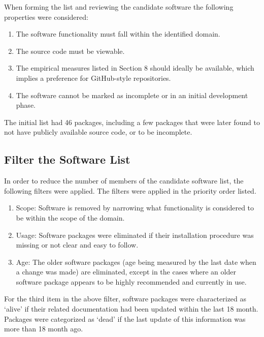 \documentclass[12pt, notitlepage]{article}
\begin{document}
When forming the list and reviewing the candidate software the following properties were considered:

\begin{enumerate}
	\item The software functionality must fall within the identified domain.
	\item The source code must be viewable.
	\item The empirical measures listed in Section 8 should ideally be available, which implies a preference for GitHub-style repositories.
	\item The software cannot be marked as incomplete or in an initial development phase.
\end{enumerate}

The initial list had 46 packages, including a few packages that were later found to not have publicly available source code, or to be incomplete. 

\subsection{Filter the Software List}\label{filtersoftware}

In order to reduce the number of members of the candidate software list, the following filters were applied. The filters were applied in the priority order listed.

\begin{enumerate}
	\item Scope: Software is removed by narrowing what functionality is considered to be within the scope of the domain.
	\item Usage: Software packages were eliminated if their installation procedure was missing or not clear and easy to follow.
	\item Age: The older software packages (age being measured by the last date when a change was made) are eliminated, except in the cases where an older software package appears to be highly recommended and currently in use. 
\end{enumerate}

For the third item in the above filter, software packages were characterized as `alive' if their related documentation had been updated within
the last 18 month. Packages were categorized as `dead' if the last update of this information was more than 18 month ago.\\ 
\end{document}
